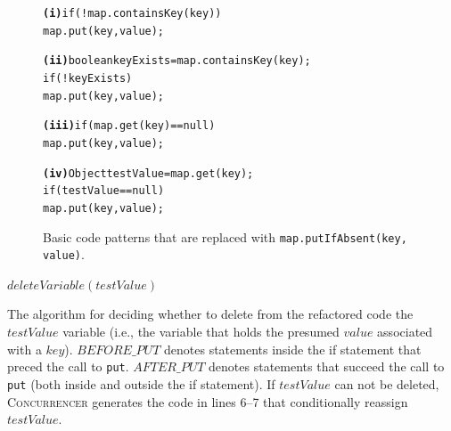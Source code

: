 \documentclass[10pt,twocolumn]{article}
\newcommand{\toolx}{{\smaller\textsc{Concurrencer}}\xspace}
\newenvironment{CodeOut}{\begin{scriptsize}}{\end{scriptsize}}
\newcommand{\codex}[1]{{\smaller\texttt{#1}}\xspace}
\begin{document}
\begin{figure}[th]
\begin{CodeOut}
\begin{alltt}
\textbf{\textsf{(i)}}   if (!map.containsKey(key)) {
        map.put(key, value);
      }
      
\textbf{\textsf{(ii)}}   boolean keyExists = map.containsKey(key);
     if (!keyExists) {
        map.put(key, value);
      }
                                                
\textbf{\textsf{(iii)}}  if (map.get(key) == null) {
        map.put(key, value);
      }
      
\textbf{\textsf{(iv)}}  Object testValue = map.get(key);
    if (testValue == null) {
       map.put(key, value);
    }
\end{alltt}
\end{CodeOut}
\vspace{-15pt}
\caption{Basic code patterns that are replaced with
\codex{map.putIfAbsent(key, value)}.}
\label{fig:basicPatternsForPutIfAbsent}
\end{figure}


\begin{algorithm}[t]
  \linesnumbered
  \SetVline %
   {
     $\mathit{deleteVariable(testValue)}$\;
  } 
\vspace{3pt}
  \caption{\label{fig:algorithmDeleteTestValue} The algorithm for deciding whether
  to delete from the refactored code the $\mathit{testValue}$ variable (i.e.,
  the variable that holds the presumed $\mathit{value}$ associated with a $\mathit{key}$).
  $\mathit{BEFORE\_PUT}$ denotes statements inside the if statement that
  preced the call to \codex{put}. $\mathit{AFTER\_PUT}$ denotes
  statements that succeed the call to \codex{put} (both inside and outside the
  if statement). If $\mathit{testValue}$ can not be deleted, \toolx generates
  the code in lines 6--7 that conditionally reassign $\mathit{testValue}$. 
   \vspace{-3pt}
  }
\end{algorithm}
\end{document}
